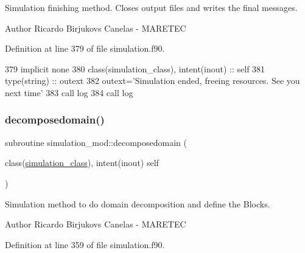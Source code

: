 Simulation finishing method. Closes output files and writes the final messages. 

\begin{DoxyAuthor}{Author}
Ricardo Birjukovs Canelas -\/ M\+A\+R\+E\+T\+EC 
\end{DoxyAuthor}


Definition at line 379 of file simulation.\+f90.


\begin{DoxyCode}
379     \textcolor{keywordtype}{implicit none}
380     \textcolor{keywordtype}{class}(simulation\_class), \textcolor{keywordtype}{intent(inout)} :: self
381     \textcolor{keywordtype}{type}(string) :: outext
382     outext=\textcolor{stringliteral}{'Simulation ended, freeing resources. See you next time'}
383     \textcolor{keyword}{call }log%
384     \textcolor{keyword}{call }log%
\end{DoxyCode}
\mbox{\label{namespacesimulation__mod_a2b8198a9fb3f7671c6b45192a0b9740c}} 
\subsubsection{\texorpdfstring{decomposedomain()}{decomposedomain()}}
{\footnotesize\ttfamily subroutine simulation\+\_\+mod\+::decomposedomain (\begin{DoxyParamCaption}\item[{class(\mbox{\hyperlink{structsimulation__mod_1_1simulation__class}{simulation\+\_\+class}}), intent(inout)}]{self }\end{DoxyParamCaption})\hspace{0.3cm}{\ttfamily [private]}}



Simulation method to do domain decomposition and define the Blocks. 

\begin{DoxyAuthor}{Author}
Ricardo Birjukovs Canelas -\/ M\+A\+R\+E\+T\+EC 
\end{DoxyAuthor}


Definition at line 359 of file simulation.\+f90.


